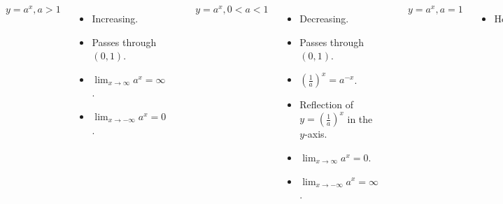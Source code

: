 \begin{frame}
\begin{columns}[t]
\includegraphics[height=3cm]{exponential-functions/pictures/07-02-exptypesa.pdf}%

$y = a^x, a > 1$
\begin{itemize}
\item<2->  Increasing.
\item<3->  Passes through $(0,1)$.
\item<4->  $\lim_{x \rightarrow \infty} a^x = \infty$.
\item<5->  $\lim_{x \rightarrow -\infty} a^x = 0$.
\end{itemize}
\includegraphics[height=3cm]{exponential-functions/pictures/07-02-exptypesb.pdf}%

$y = a^x, 0 < a < 1$
\begin{itemize}
\item<6->  Decreasing.
\item<7->  Passes through $(0,1)$.
\item<8->  $\left(\frac{1}{a}\right)^x = a^{-x}$.
\item<9->  Reflection of $y = \left(\frac{1}{a}\right)^x$ in the $y$-axis.
\item<10->  $\lim_{x \rightarrow \infty} a^x = 0$.
\item<11->  $\lim_{x \rightarrow -\infty} a^x = \infty$.
\end{itemize}
\includegraphics[height=3cm]{exponential-functions/pictures/07-02-exptypesc.pdf}%

$y = a^x, a = 1$
\begin{itemize}
\item<12->  Horizontal.
\end{itemize}
\end{columns}
\end{frame}


